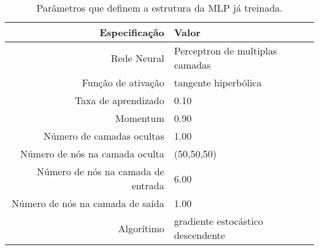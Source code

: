 \begin{table}[H]
\centering
\caption{Parâmetros que definem a estrutura da MLP já treinada.}
\label{parametros_rede_treinada}
\begin{tabular}{ r | l }
\toprule
\textbf{Especificação} & \textbf{Valor} \\
\midrule
Rede Neural & Perceptron de multiplas camadas \\
Função de ativação & tangente hiperbólica \\
Taxa de aprendizado & 0.10 \\
Momentum & 0.90 \\
Número de camadas ocultas & 1.00 \\
Número de nós na camada oculta & {(50,50,50)} \\
Número de nós na camada de entrada  & 6.00 \\
Número de nós na camada de saída & 1.00 \\
Algorítimo  & gradiente estocástico descendente \\
\bottomrule
\end{tabular}
\end{table}
